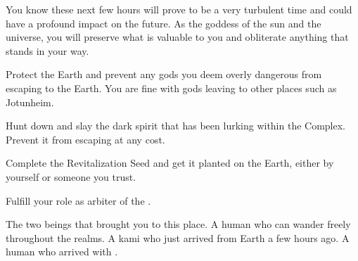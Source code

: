 \documentclass[char]{guardians}
\begin{document}
You know these next few hours will prove to be a very turbulent time and could have a profound impact on the future. As the goddess of the sun and the universe, you will preserve what is valuable to you and obliterate anything that stands in your way.

\begin{itemz}[Goals]
  \item Protect the Earth and prevent any gods you deem overly dangerous from escaping to the Earth. You are fine with gods leaving to other places such as Jotunheim.
	\item Hunt down and slay the dark spirit that has been lurking within the Complex. Prevent it from escaping at any cost.
	\item Complete the Revitalization Seed and get it planted on the Earth, either by yourself or someone you trust.
	\item Fulfill your role as arbiter of the \pGames{}.
\end{itemz}

\begin{contacts}
   The two beings that brought you to this place.
	\contact{\cJascha{}} A human who can wander freely throughout the realms.
	\contact{\cUnity{}} A kami who just arrived from Earth a few hours ago.
	\contact{\cKachiko{}} A human who arrived with \cUnity{}.
\end{contacts}
\end{document}
